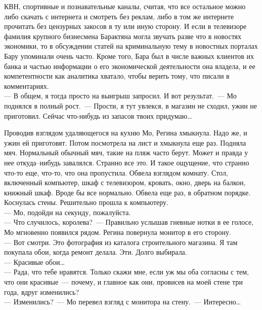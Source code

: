 КВН, 
спортивные и познавательные каналы, считая, что все остальное можно либо 
скачать 
с интернета и смотреть без реклам, либо в том же интернете прочитать без 
цензурных закосов в ту или иную сторону. И если в телевизоре фамилия крупного 
бизнесмена Барактяна могла звучать разве что в новостях экономики, то в 
обсуждении статей на криминальную тему в новостных порталах Бару упоминали 
очень 
часто. Кроме того, Бара был в числе важных клиентов их банка и частью 
информации 
о его экономической деятельности она владела, и ее компетентности как аналитика 
хватало, чтобы верить тому, что писали в комментариях.\\
--- В общем, я тогда просто на выигрыш запросил. И вот результат.~--- Мо 
поднялся в полный рост.~--- Прости, я тут увлекся, в магазин не сходил, ужин не 
приготовил. Сейчас что-нибудь из запасов твоих придумаю\ldots

Проводив взглядом удаляющегося на кухню Мо, Регина хмыкнула. Надо же, и ужин ей 
приготовят. Потом посмотрела на лист и хмыкнула еще раз. Подняла мяч. 
Нормальный 
обычный мяч, такие на пляж часто берут. Может и правда у нее откуда--нибудь 
завалялся. Странно все это. И такое ощущение, что странно что-то еще, что-то, 
что она пропустила. Обвела взглядом комнату. Стол, включенный компьютер, шкаф с 
телевизором, кровать, окно, дверь на балкон, книжный шкаф. Вроде бы все 
нормально. Обвела еще раз, в обратном порядке. Коснулась стены. Решительно 
прошла к компьютеру.\\
--- Мо, подойди на секунду, пожалуйста.\\
--- Что случилось, королева?~--- Правильно услышав гневные нотки в ее голосе, 
Мо мгновенно появился рядом. Регина повернула монитор в его сторону.\\
--- Вот смотри. Это фотография из каталога строительного магазина. Я там 
покупала обои, когда ремонт делала. Эти. Долго выбирала.\\
--- Красивые обои\ldots\\
--- Рада, что тебе нравятся. Только скажи мне, если уж мы оба согласны с тем, 
что они красивые~--- почему, и главное как они, провисев на моей стене три 
года, вдруг изменились?\\
--- Изменились?~--- Мо перевел взгляд с монитора на стену.~--- Интересно\ldots

